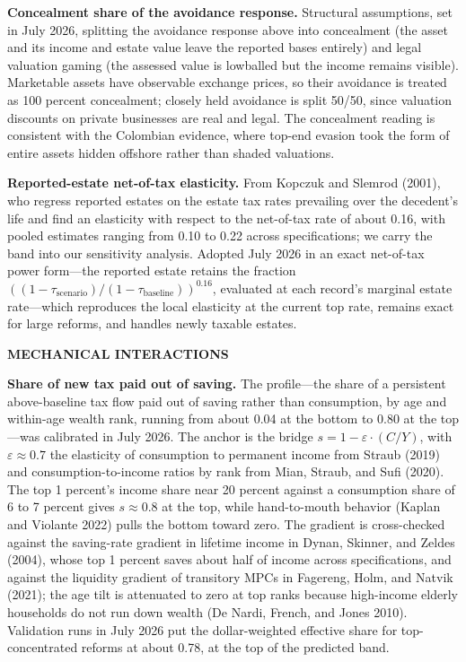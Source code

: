 \documentclass[10pt,twocolumn]{article}
\begin{document}
\textbf{Concealment share of the avoidance response.} Structural assumptions,
set in July 2026, splitting the avoidance response above into concealment (the
asset and its income and estate value leave the reported bases entirely) and
legal valuation gaming (the assessed value is lowballed but the income remains
visible). Marketable assets have observable exchange prices, so their
avoidance is treated as 100 percent concealment; closely held avoidance is
split 50/50, since valuation discounts on private businesses are real and
legal. The concealment reading is consistent with the Colombian evidence,
where top-end evasion took the form of entire assets hidden offshore rather
than shaded valuations.

\textbf{Reported-estate net-of-tax elasticity.} From Kopczuk and Slemrod
(2001), who regress reported estates on the estate tax rates prevailing over
the decedent's life and find an elasticity with respect to the net-of-tax rate
of about 0.16, with pooled estimates ranging from 0.10 to 0.22 across
specifications; we carry the band into our sensitivity analysis. Adopted July
2026 in an exact net-of-tax power form---the reported estate retains the
fraction $((1 - \tau_{\text{scenario}})/(1 - \tau_{\text{baseline}}))^{0.16}$,
evaluated at each record's marginal estate rate---which reproduces the local
elasticity at the current top rate, remains exact for large reforms, and
handles newly taxable estates.

\medskip\noindent\textbf{\small MECHANICAL INTERACTIONS}

\textbf{Share of new tax paid out of saving.} The profile---the share of a persistent above-baseline tax flow paid out of saving rather than
consumption, by age and within-age wealth rank, running from about 0.04 at the
bottom to 0.80 at the top---was calibrated in July 2026. The anchor is the
bridge $s = 1 - \varepsilon \cdot (C/Y)$, with $\varepsilon \approx 0.7$ the
elasticity of consumption to permanent income from Straub (2019) and
consumption-to-income ratios by rank from Mian, Straub, and Sufi (2020). The
top 1 percent's income share near 20 percent against a consumption share of 6
to 7 percent gives $s \approx 0.8$ at the top, while hand-to-mouth behavior
(Kaplan and Violante 2022) pulls the bottom toward zero. The gradient is
cross-checked against the saving-rate gradient in lifetime income in Dynan,
Skinner, and Zeldes (2004), whose top 1 percent saves about half of income
across specifications, and against the liquidity gradient of transitory MPCs
in Fagereng, Holm, and Natvik (2021); the age tilt is attenuated to zero at
top ranks because high-income elderly households do not run down wealth (De
Nardi, French, and Jones 2010). Validation runs in July 2026 put the
dollar-weighted effective share for top-concentrated reforms at about 0.78, at
the top of the predicted band.
\end{document}
